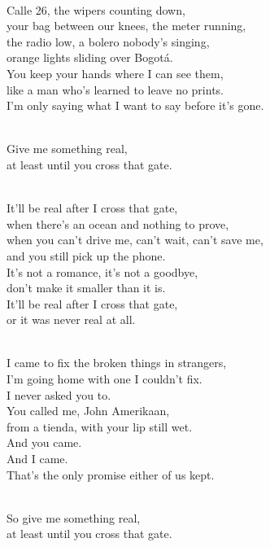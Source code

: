 \begin{lyrics}

\\
Calle 26, the wipers counting down,\\
your bag between our knees, the meter running,\\
the radio low, a bolero nobody's singing,\\
orange lights sliding over Bogotá.
\\
You keep your hands where I can see them,\\
like a man who's learned to leave no prints.
\\
I'm only saying what I want to say before it's gone.

\\
Give me something real,\\
at least until you cross that gate.

\\
It'll be real after I cross that gate,\\
when there's an ocean and nothing to prove,\\
when you can't drive me, can't wait, can't save me,\\
and you still pick up the phone.\\
It's not a romance, it's not a goodbye,\\
don't make it smaller than it is.\\
It'll be real after I cross that gate,\\
or it was never real at all.

\\
I came to fix the broken things in strangers,\\
I'm going home with one I couldn't fix.
\\
I never asked you to.
\\
You called me, John Amerikaan,\\
from a tienda, with your lip still wet.
\\
And you came.
\\
And I came.\\
That's the only promise either of us kept.

\\
So give me something real,\\
at least until you cross that gate.


\end{lyrics}

